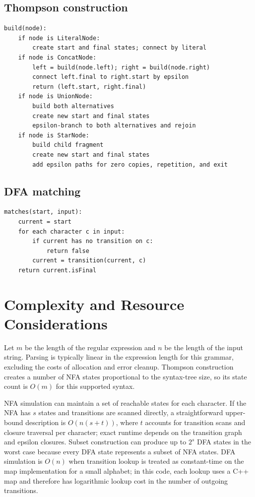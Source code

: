 \documentclass[12pt,a4paper]{report}
\begin{document}
\subsection{Thompson construction}
\begin{lstlisting}[language={},numbers=none]
build(node):
    if node is LiteralNode:
        create start and final states; connect by literal
    if node is ConcatNode:
        left = build(node.left); right = build(node.right)
        connect left.final to right.start by epsilon
        return (left.start, right.final)
    if node is UnionNode:
        build both alternatives
        create new start and final states
        epsilon-branch to both alternatives and rejoin
    if node is StarNode:
        build child fragment
        create new start and final states
        add epsilon paths for zero copies, repetition, and exit
\end{lstlisting}

\subsection{DFA matching}
\begin{lstlisting}[language={},numbers=none]
matches(start, input):
    current = start
    for each character c in input:
        if current has no transition on c:
            return false
        current = transition(current, c)
    return current.isFinal
\end{lstlisting}

\section{Complexity and Resource Considerations}
Let $m$ be the length of the regular expression and $n$ be the length of the input string. Parsing is typically linear in the expression length for this grammar, excluding the costs of allocation and error cleanup. Thompson construction creates a number of NFA states proportional to the syntax-tree size, so its state count is $O(m)$ for this supported syntax.

NFA simulation can maintain a set of reachable states for each character. If the NFA has $s$ states and transitions are scanned directly, a straightforward upper-bound description is $O(n(s+t))$, where $t$ accounts for transition scans and closure traversal per character; exact runtime depends on the transition graph and epsilon closures. Subset construction can produce up to $2^s$ DFA states in the worst case because every DFA state represents a subset of NFA states. DFA simulation is $O(n)$ when transition lookup is treated as constant-time on the map implementation for a small alphabet; in this code, each lookup uses a C++ map and therefore has logarithmic lookup cost in the number of outgoing transitions.
\end{document}
